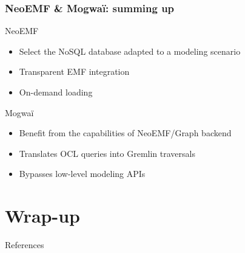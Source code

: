 \begin{frame}[c]\frametitle{NeoEMF \& Mogwa\"i: summing up}
	\begin{block}{NeoEMF}
	  \begin{itemize}
		\item Select the NoSQL database adapted to a modeling scenario
		\item Transparent EMF integration
		\item On-demand loading
	  \end{itemize}
	\end{block}

  \begin{block}{Mogwa\"i}
		\begin{itemize}
		\item Benefit from the capabilities of NeoEMF/Graph backend
		\item Translates OCL queries into Gremlin traversals
		\item Bypasses low-level modeling APIs
	  \end{itemize}
  \end{block}
\end{frame}

\section{Wrap-up}

\begin{frame}[allowframebreaks]{References}
  
  
\end{frame}


